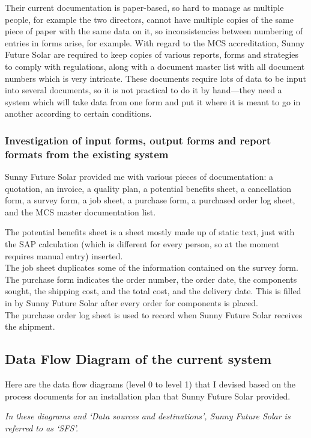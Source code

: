 Their current documentation is paper-based, so hard to manage as multiple people, for example the two directors, cannot have multiple copies of the same piece of paper with the same data on it, so inconsistencies between numbering of entries in forms arise, for example.  With regard to the MCS accreditation, Sunny Future Solar are required to keep copies of various reports, forms and strategies to comply with regulations, along with a document master list with all document numbers which is very intricate.  These documents require lots of data to be input into several documents, so it is not practical to do it by hand---they need a system which will take data from one form and put it where it is meant to go in another according to certain conditions.
			\subsubsection{Investigation of input forms, output forms and report formats from the existing system}
Sunny Future Solar provided me with various pieces of documentation: a quotation, an invoice, a quality plan, a potential benefits sheet, a cancellation form, a survey form, a job sheet, a purchase form, a purchased order log sheet, and the MCS master documentation list.

The potential benefits sheet is a sheet mostly made up of static text, just with the SAP calculation (which is different for every person, so at the moment requires manual entry) inserted.\\
The job sheet duplicates some of the information contained on the survey form.\\
The purchase form indicates the order number, the order date, the components sought, the shipping cost, and the total cost, and the delivery date.  This is filled in by Sunny Future Solar after every order for components is placed.\\
The purchase order log sheet is used to record when Sunny Future Solar receives the shipment.\\
		\subsection{Data Flow Diagram of the current system}
Here are the data flow diagrams (level 0 to level 1) that I devised based on the process documents for an installation plan that Sunny Future Solar provided.

\textsl{In these diagrams and `Data sources and destinations', Sunny Future Solar is referred to as `SFS'.}

